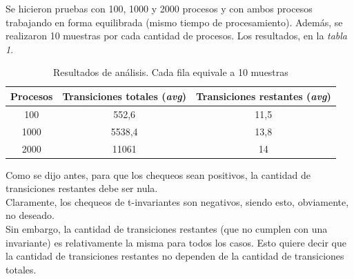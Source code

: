 \documentclass{article}
\begin{document}
\begin{flushleft}
        Se hicieron pruebas con 100, 1000 y 2000 procesos y con ambos procesos trabajando en forma
        equilibrada (mismo tiempo de procesamiento). Además, se realizaron 10 muestras por cada 
        cantidad de procesos. Los resultados, en la \emph{tabla 1}.\newline \newline
        \begin{center}
            \begin{table}[h]
                \begin{tabular}{||c|c|c||} 
                    \hline
                    Procesos & Transiciones totales (\emph{avg}) & Transiciones restantes (\emph{avg}) \\ [0.5ex] 
                    \hline\hline
                    100 & 552,6 & 11,5 \\ 
                    \hline
                    1000 & 5538,4 & 13,8 \\
                    \hline
                    2000 & 11061 & 14 \\
                    \hline
               \end{tabular}
               \caption{Resultados de análisis. Cada fila equivale a 10 muestras}
            \end{table}
        \end{center}
        Como se dijo antes, para que los chequeos sean positivos, la cantidad de transiciones restantes
        debe ser nula. \\
        Claramente, los chequeos de t-invariantes son negativos, siendo esto, obviamente, no deseado. \\
        Sin embargo, la cantidad de transiciones restantes (que no cumplen con una invariante) es 
        relativamente la misma para todos los casos. Esto quiere decir que la cantidad de transiciones
        restantes no dependen de la cantidad de transiciones totales.
    \end{flushleft}
\end{document}
